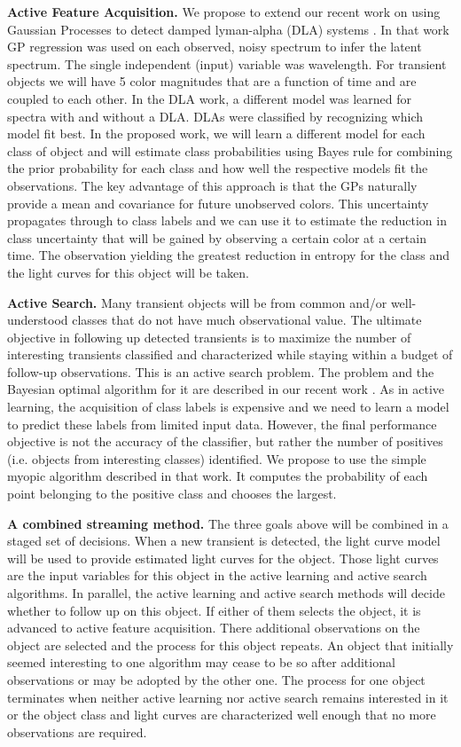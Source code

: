 \documentclass[useAMS,usenatbib,tightenlines,11pt,preprint]{aastex}
\begin{document}
{\bf Active Feature Acquisition.}  We propose to extend our recent work on 
using Gaussian Processes to detect damped
lyman-alpha (DLA) systems \cite{Garnett12a}.  In that work GP regression
was used on each observed, noisy spectrum to infer the latent spectrum.
The single independent (input) variable was wavelength.  For transient
objects we will have 5 color magnitudes that are a function of time and are
coupled to each other.  In the DLA work, a different model was learned for
spectra with and without a DLA.  DLAs were classified by recognizing which
model fit best.  In the proposed work, we will learn a different model for
each class of object and will estimate class probabilities using Bayes rule
for combining the prior probability for each class and how well the
respective models fit the observations.  The key advantage of this approach
is that the GPs naturally provide a mean and covariance for future
unobserved colors.  This uncertainty propagates through to class labels and
we can use it to estimate the reduction in class uncertainty that will be
gained by observing a certain color at a certain time.  The observation
yielding the greatest reduction in entropy for the class and the light
curves for this object will be taken.

{\bf Active Search.} Many transient objects will be from common and/or 
well-understood classes that do not have much observational value.  The ultimate
objective in following up detected transients is to maximize the number of
interesting transients classified and characterized while staying within a
budget of follow-up observations.  This is an active search problem. The
problem and the Bayesian optimal algorithm for it are described in our
recent work \cite{Garnett11,Garnett12}.  As in active learning, the
acquisition of class labels is expensive and we need to learn a model to
predict these labels from limited input data.  However, the final
performance objective is not the accuracy of the classifier, but rather the
number of positives (i.e. objects from interesting classes) identified.  We
propose to use the simple myopic algorithm described in that work.  It
computes the probability of each point belonging to the positive class and
chooses the largest.


{\bf A combined streaming method.} The three goals above will be combined
in a staged set of decisions.  When a new transient is detected, the light
curve model will be used to provide estimated light curves for the object.
Those light curves are the input variables for this object in the active
learning and active search algorithms.  In parallel, the active learning
and active search methods will decide whether to follow up on this object.
If either of them selects the object, it is advanced to active feature
acquisition.  There additional observations on the object are selected and
the process for this object repeats.  An object that initially seemed
interesting to one algorithm may cease to be so after additional
observations or may be adopted by the other one.  The process for one
object terminates when neither active learning nor active search remains
interested in it or the object class and light curves are characterized
well enough that no more observations are required.
\end{document}
